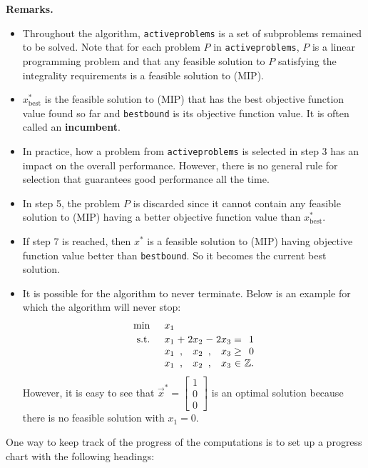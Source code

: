 \textbf{Remarks.}

\begin{itemize}
\item
  Throughout the algorithm, \texttt{activeproblems} is a set of
  subproblems remained to be solved. Note that for each problem \(P\) in
  \texttt{activeproblems}, \(P\) is a linear programming problem and
  that any feasible solution to \(P\) satisfying the integrality
  requirements is a feasible solution to (MIP).
\item
  \(x^*_{\text{best}}\) is the feasible solution to (MIP) that has the
  best objective function value found so far and \texttt{bestbound} is
  its objective function value. It is often called an
  \textbf{incumbent}.
\item
  In practice, how a problem from \texttt{activeproblems} is selected in
  step 3 has an impact on the overall performance. However, there is no
  general rule for selection that guarantees good performance all the
  time.
\item
  In step 5, the problem \(P\) is discarded since it cannot contain any
  feasible solution to (MIP) having a better objective function value
  than \(x^*_{\text{best}}\).
\item
  If step 7 is reached, then \(x^*\) is a feasible solution to (MIP)
  having objective function value better than \texttt{bestbound}. So it
  becomes the current best solution.
\item
  It is possible for the algorithm to never terminate. Below is an
  example for which the algorithm will never stop:
  \[
  \begin{array}{l r@{\;}c@{\;}r@{\;}c@{\;}r@{\;}c@{\;}r}
  \min & x_1 &   &      &   &      &      &   \\[2pt]
  \st  & x_1 & + & 2x_2 & - & 2x_3 & =    & 1 \\
       & x_1 & , &  x_2 & , &  x_3 & \geq & 0 \\
       & x_1 & , &  x_2 & , &  x_3 & \in  & \mathbb{Z}.
  \end{array}
  \] However, it is easy to see that
  \(\vec{x}^* = \begin{bmatrix} 1 \\ 0 \\ 0\end{bmatrix}\) is an optimal
  solution because there is no feasible solution with \(x_1=0\).
\end{itemize}

One way to keep track of the progress of the computations is to set up a
progress chart with the following headings:

